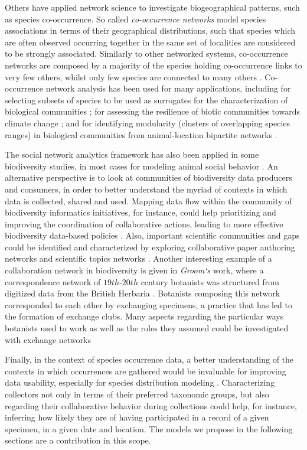 Others have applied network science to investigate biogeographical patterns, such as species co-occurrence. 
So called \textit{co-occurrence networks} model species associations in terms of their geographical distributions, such that species which are often observed occurring together in the same set of localities are considered to be strongly associated.
Similarly to other networked systems, co-occurrence networks are composed by a majority of the species holding co-occurrence links to very few others, whilst only few species are connected to many others \cite{Araujo2011a}.
Co-occurrence network analysis has been used for many applications, including for selecting subsets of species to be used as surrogates for the characterization of biological communities \cite{Tulloch2016};
for assessing the resilience of biotic communities towards climate change \cite{Araujo2011a};
and for identifying modularity (clusters of overlapping species ranges) in biological communities from animal-location bipartite networks \cite{Thebault2003}.


The social network analytics framework has also been applied in some biodiversity studies, in most cases for modeling animal social behavior \cite{faust2011animal}.
An alternative perspective is to look at communities of biodiversity data producers and consumers, in order to better understand the myriad of contexts in which data is collected, shared and used.
%
Mapping data flow within the community of biodiversity informatics initiatives, for instance, could help prioritizing and improving the coordination of collaborative actions, leading to more effective biodiversity data-based policies \cite{Bingham2017}.
%
Also, important scientific communities and gaps could be identified and characterized by exploring collaborative paper authoring networks and scientific topics networks \cite{Borrett2014}. 
%
Another interesting example of a collaboration network in biodiversity is given in \textit{Groom`s} work, where a correspondence network of $19th$-$20th$ century botanists was structured from digitized data from the British Herbaria \cite{Groom2014}.
Botanists composing this network corresponded to each other by exchanging specimens, a practice that has led to the formation of exchange clubs.
Many aspects regarding the particular ways botanists used to work as well as the roles they assumed could be investigated with exchange networks 

Finally, in the context of species occurrence data, a better understanding of the contexts in which occurrences are gathered would be invaluable for improving data usability, especially for species distribution modeling \cite{Daru2017}. 
Characterizing collectors not only in terms of their preferred taxonomic groups, but also regarding their collaborative behavior during collections could help, for instance, inferring how likely they are of having participated in a record of a given specimen, in a given date and location.   
The models we propose in the following sections are a contribution in this scope.
  




